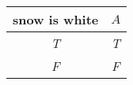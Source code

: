 
\begin{center}
\begin{tabular}{c||c}
 snow is white & $A$ \\
\hline
\emph{T} & \emph{T}  \\
\emph{F} & \emph{F} \\
\end{tabular}
\end{center}

